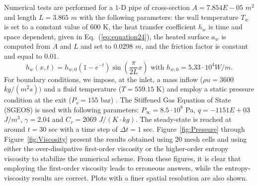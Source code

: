 \documentclass[12pt]{article}
\newcommand{\eqt}[1]{Eq.~(\ref{#1})} %
\begin{document}
Numerical tests are performed for a $1$-D pipe of cross-section $A = 7.854E-05$ $m^2$ and length $L=3.865$ $m$ with the following parameters: the wall temperature $T_w$ is set to a constant value of $600$ K, the heat transfer coefficient $h_w$ is time and space dependent, given in \eqt{eq:equation24}, the heated surface $a_w$ is computed from $A$ and $L$ and set to $0.0298$ $m$, and the friction factor is constant and equal to $0.01$.
\begin{equation}
\label{eq:equation24}
h_w(x,t) = h_{w,0}(1-e^{-t})\sin \left( \frac{\pi}{2L} x\right) \text{ with } h_{w,0} = 5.33 \cdot 10^4 W / m.
\end{equation}
For boundary conditions, we impose, at the inlet, a mass inflow ($\rho u = 3600$ $kg/(m^2 s))$ and a fluid temperature ($T = 559.15$ K) and employ a static pressure condition at the exit ($P_s = 155$ bar) . The Stiffened Gas Equation of State (SGEOS) is used \cite{SGEOS} with following parameters: $P_{\infty} = 8.5 \cdot 10^8$ Pa, $q = -1151E+03$ $J/m^3$, $\gamma = 2.04$ and $C_v = 2069$ $J/(K \cdot kg)$. The steady-state is reached at around $t=30$ sec with a time step of $\Delta t = 1$ sec. Figure~\ref{fig:Pressure} through Figure~\ref{fig:Viscosity} present the results obtained using 20 mesh cells and using either the over-dissipative first-order viscosity  or the higher-order entropy viscosity to stabilize the numerical scheme. From these figures, it is clear that employing the first-order viscosity leads to erroneous answers, while the entropy-viscosity results are correct. Plots with a finer spatial resolution are also shown.
\end{document}
